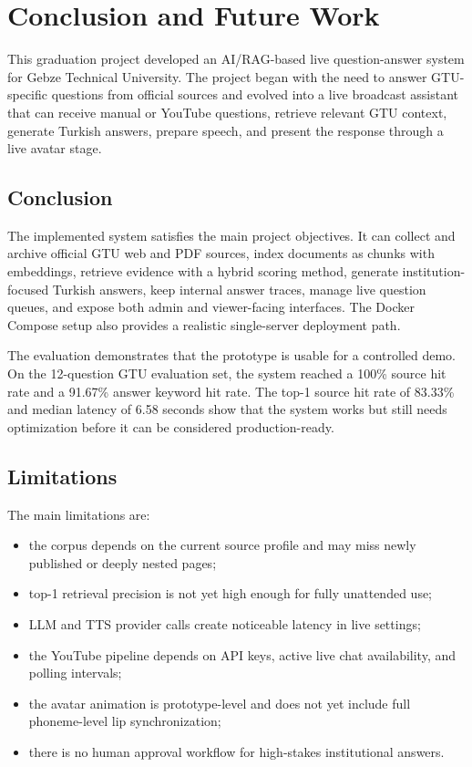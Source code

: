 \chapter{Conclusion and Future Work}

This graduation project developed an AI/RAG-based live question-answer system for Gebze Technical University. The project began with the need to answer GTU-specific questions from official sources and evolved into a live broadcast assistant that can receive manual or YouTube questions, retrieve relevant GTU context, generate Turkish answers, prepare speech, and present the response through a live avatar stage.

\section{Conclusion}

The implemented system satisfies the main project objectives. It can collect and archive official GTU web and PDF sources, index documents as chunks with embeddings, retrieve evidence with a hybrid scoring method, generate institution-focused Turkish answers, keep internal answer traces, manage live question queues, and expose both admin and viewer-facing interfaces. The Docker Compose setup also provides a realistic single-server deployment path.

The evaluation demonstrates that the prototype is usable for a controlled demo. On the 12-question GTU evaluation set, the system reached a 100\% source hit rate and a 91.67\% answer keyword hit rate. The top-1 source hit rate of 83.33\% and median latency of 6.58 seconds show that the system works but still needs optimization before it can be considered production-ready.

\section{Limitations}

The main limitations are:

\begin{itemize}
    \item the corpus depends on the current source profile and may miss newly published or deeply nested pages;
    \item top-1 retrieval precision is not yet high enough for fully unattended use;
    \item LLM and TTS provider calls create noticeable latency in live settings;
    \item the YouTube pipeline depends on API keys, active live chat availability, and polling intervals;
    \item the avatar animation is prototype-level and does not yet include full phoneme-level lip synchronization;
    \item there is no human approval workflow for high-stakes institutional answers.
\end{itemize}

